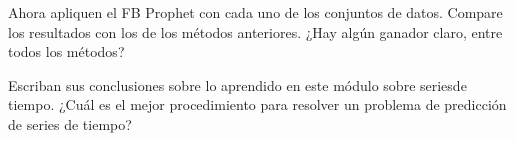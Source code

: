 \begin{problema}
	Ahora apliquen el FB Prophet con cada uno de los conjuntos de datos. Compare los resultados con los de los métodos anteriores.  ¿Hay algún ganador claro, entre todos los métodos?
\end{problema}


\begin{problema}
	 Escriban sus conclusiones sobre lo aprendido en este módulo sobre seriesde tiempo.  ¿Cuál es el mejor procedimiento para resolver un problema de predicción de series de tiempo?  
\end{problema}






